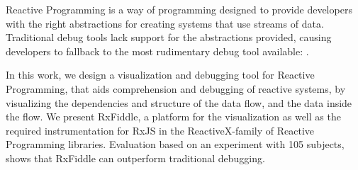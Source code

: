 Reactive Programming is a way of programming designed to provide
developers with the right abstractions for creating systems that use
streams of data.  Traditional debug tools lack support for the
abstractions provided, causing developers to fallback to the most
rudimentary debug tool available:  \printfdebugging{}.

In this work, we design a visualization and debugging tool for Reactive
Programming, that aids comprehension and debugging of reactive systems,
by visualizing the dependencies and structure of the data flow, and the
data inside the flow.  We present RxFiddle, a platform for the
visualization as well as the required instrumentation for RxJS in the
ReactiveX-family of Reactive Programming libraries.  Evaluation based on
an experiment with 105 subjects, shows that RxFiddle can outperform
traditional debugging.
